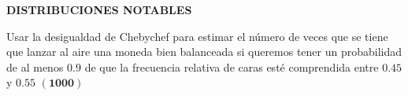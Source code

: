 \documentclass[12pt]{article}
\begin{document}
\begin{centerline}
{{\bf DISTRIBUCIONES NOTABLES}}
\end{centerline}

 \begin{prob} Usar la desigualdad de Chebychef para estimar el número de veces
 que se tiene que lanzar al aire una moneda bien balanceada si queremos tener un probabilidad
 de al menos  $0.9$ de que la frecuencia relativa de caras esté comprendida entre $0.45$ y $0.55$
 $\mathbf{(1000)}$
 \end{prob}
%  
%  





\end{document}
